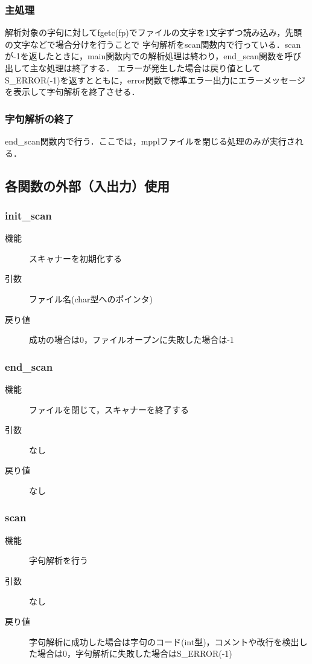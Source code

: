 \documentclass{jlreq}
\begin{document}
\subsubsection{主処理}
解析対象の字句に対してfgetc(fp)でファイルの文字を1文字ずつ読み込み，先頭の文字などで場合分けを行うことで
字句解析をscan関数内で行っている．scanが-1を返したときに，main関数内での解析処理は終わり，end\_scan関数を呼び出して主な処理は終了する．
エラーが発生した場合は戻り値としてS\_ERROR(-1)を返すとともに，error関数で標準エラー出力にエラーメッセージを表示して字句解析を終了させる．

\subsubsection{字句解析の終了}
end\_scan関数内で行う．ここでは，mpplファイルを閉じる処理のみが実行される．

\subsection{各関数の外部（入出力）使用}

\subsubsection{init\_scan}
\begin{description}
  \item[機能] スキャナーを初期化する
  \item[引数] ファイル名(char型へのポインタ)
  \item[戻り値] 成功の場合は0，ファイルオープンに失敗した場合は-1
\end{description}

\subsubsection{end\_scan}
\begin{description}
  \item[機能] ファイルを閉じて，スキャナーを終了する
  \item[引数] なし
  \item[戻り値] なし
\end{description}

\subsubsection{scan}
\begin{description}
  \item[機能] 字句解析を行う
  \item[引数] なし
  \item[戻り値] 字句解析に成功した場合は字句のコード(int型)，コメントや改行を検出した場合は0，字句解析に失敗した場合はS\_ERROR(-1)
\end{description}
\end{document}
